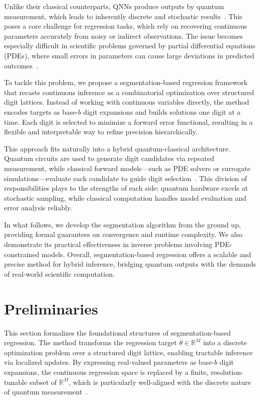 \documentclass[aps,twocolumn,superscriptaddress,nofootinbib]{revtex4}
\begin{document}
Unlike their classical counterparts, QNNs produce outputs by quantum measurement, which leads to inherently discrete and stochastic results~\cite{peres1995quantum,schuld2019feature}. This poses a core challenge for regression tasks, which rely on recovering continuous parameters accurately from noisy or indirect observations. The issue becomes especially difficult in scientific problems governed by partial differential equations (PDEs), where small errors in parameters can cause large deviations in predicted outcomes~\cite{kaipio2005inverse}.

To tackle this problem, we propose a segmentation-based regression framework that recasts continuous inference as a combinatorial optimization over structured digit lattices. Instead of working with continuous variables directly, the method encodes targets as base-$b$ digit expansions and builds solutions one digit at a time. Each digit is selected to minimize a forward error functional, resulting in a flexible and interpretable way to refine precision hierarchically.

This approach fits naturally into a hybrid quantum-classical architecture. Quantum circuits are used to generate digit candidates via repeated measurement, while classical forward models—such as PDE solvers or surrogate simulations—evaluate each candidate to guide digit selection~\cite{cerezo2021variational,mitarai2018parameter}. This division of responsibilities plays to the strengths of each side: quantum hardware excels at stochastic sampling, while classical computation handles model evaluation and error analysis reliably.

In what follows, we develop the segmentation algorithm from the ground up, providing formal guarantees on convergence and runtime complexity. We also demonstrate its practical effectiveness in inverse problems involving PDE-constrained models. Overall, segmentation-based regression offers a scalable and precise method for hybrid inference, bridging quantum outputs with the demands of real-world scientific computation.



\section{Preliminaries}
\label{sec:preliminaries}
This section formalizes the foundational structures of segmentation-based regression. The method transforms the regression target $\theta \in \mathbb{R}^M$ into a discrete optimization problem over a structured digit lattice, enabling tractable inference via localized updates. By expressing real-valued parameters as base-$b$ digit expansions, the continuous regression space is replaced by a finite, resolution-tunable subset of $\mathbb{R}^M$, which is particularly well-aligned with the discrete nature of quantum measurement~\cite{schuld2020circuit, mitarai2018parameter, benedetti2019parameterized, farhi2018classification}.
\end{document}
